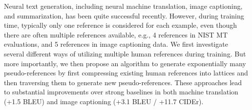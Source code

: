Neural text generation, including neural machine translation, image captioning, and summarization, has been quite successful recently. However, during training time, typically only one reference is considered for each example, even though there are often multiple references available, e.g., 4 references in NIST MT evaluations, and 5 references in image captioning data. We first investigate several different ways of utilizing multiple human references during training. But more importantly, we then propose an algorithm to generate exponentially many pseudo-references by first compressing existing human references into lattices and then traversing them to generate new pseudo-references. These approaches lead to substantial improvements over strong baselines in both machine translation (+1.5 BLEU) and image captioning (+3.1 BLEU / +11.7 CIDEr).

